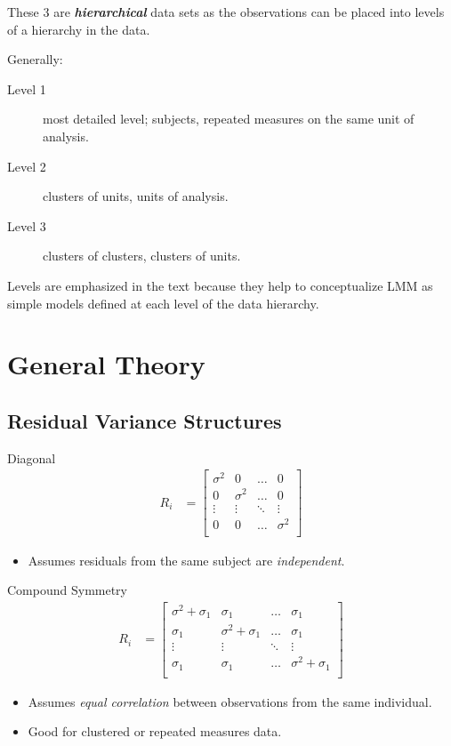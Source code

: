 \documentclass[english]{article}
\begin{document}
\begin{multicols*}{2}
\begin{rappel_enhanced}[Context]
These 3 are \textbf{\textit{hierarchical}} data sets as the observations can be placed into levels of a hierarchy in the data.

\bigskip

Generally:
\begin{description}
	\item[Level 1]	most detailed level; subjects, repeated measures on the same unit of analysis.
	\item[Level 2]	clusters of units, units of analysis.
	\item[Level 3]	clusters of clusters, clusters of units.
\end{description}

\bigskip

Levels are emphasized in the text because they help to conceptualize LMM as simple models defined at each level of the data hierarchy. 
\end{rappel_enhanced}

\section{General Theory}\label{sec:BGenTheory}
\subsection{Residual Variance Structures}
Diagonal
\begin{align*}
	R_{i}
	&=	\begin{bmatrix}
		\sigma^{2}	&	0	&	\dots	&	0	\\
		0	&	\sigma^{2}	&	\dots	&	0	\\
		\vdots	&	\vdots	&	\ddots	&	\vdots	\\
		0	&	0	&	\dots	&	\sigma^{2}	\\
		\end{bmatrix}
\end{align*}
\begin{itemize}
	\item	Assumes residuals from the same subject are \textit{independent}.
\end{itemize}

Compound Symmetry
\begin{align*}
	R_{i}
	&=	\begin{bmatrix}
		\sigma^{2} + \sigma_{1}	&	\sigma_{1}	&	\dots	&	\sigma_{1}	\\
		\sigma_{1}	&	\sigma^{2} + \sigma_{1}	&	\dots	&	\sigma_{1}	\\
		\vdots	&	\vdots	&	\ddots	&	\vdots	\\
		\sigma_{1}	&	\sigma_{1}	&	\dots	&	\sigma^{2} + \sigma_{1}	\\
		\end{bmatrix}
\end{align*}
\begin{itemize}
	\item	Assumes \textit{equal correlation} between observations from the same individual.
	\item	Good for clustered or repeated measures data.
\end{itemize}



\end{multicols*}
\end{document}
